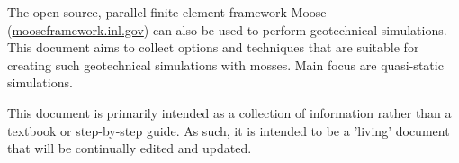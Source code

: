 The open-source, parallel finite element framework Moose
(\url{mooseframework.inl.gov}) can also be used to perform geotechnical
simulations. This document aims to collect options and techniques that are
suitable for creating such geotechnical simulations with mosses. Main focus are
quasi-static simulations.

This document is primarily intended as a collection of information rather than
a textbook or step-by-step guide. As such, it is intended to be a 'living'
document that will be continually edited and updated.

